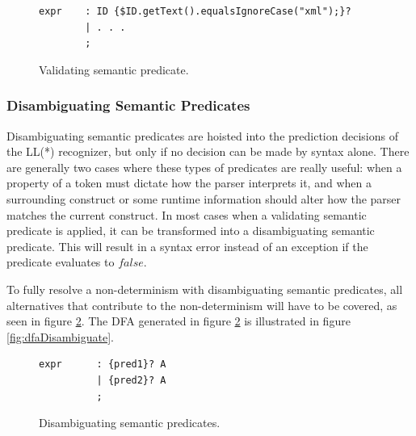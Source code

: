 \begin{figure}[h!]
\begin{verbatim}
expr    : ID {$ID.getText().equalsIgnoreCase("xml");}?
        | . . .
        ;
\end{verbatim}
\caption{Validating semantic predicate.}
\label{code:validateSemantic}
\end{figure}

\subsubsection{Disambiguating Semantic Predicates}
Disambiguating semantic predicates are hoisted into the prediction decisions of the LL(*) recognizer, but only if no decision can be made by syntax alone. There are generally two cases where these types of predicates are really useful: when a property of a token must dictate how the parser interprets it, and when a surrounding construct or some runtime information should alter how the parser matches the current construct. In most cases when a validating semantic predicate is applied, it can be transformed into a disambiguating semantic predicate. This will result in a syntax error instead of an exception if the predicate evaluates to $false$.

To fully resolve a non-determinism with disambiguating semantic predicates, all alternatives that contribute to the non-determinism will have to be covered, as seen in figure \ref{code:disambigSemantic}. The DFA generated in figure \ref{code:disambigSemantic} is illustrated in figure \ref{fig:dfaDisambiguate}.

\begin{figure}[h!]
\begin{verbatim}
expr      : {pred1}? A 
          | {pred2}? A
          ;
\end{verbatim}
\caption{Disambiguating semantic predicates.}
\label{code:disambigSemantic}
\end{figure}

